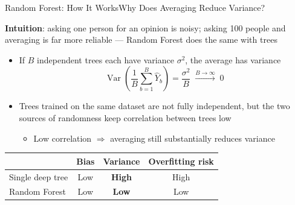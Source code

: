 \documentclass[hyperref={pdfpagelabels=false}]{beamer}
\begin{document}
\begin{frame}{Random Forest: How It Works}{Why Does Averaging Reduce Variance?}

\textbf{Intuition}: asking one person for an opinion is noisy; asking 100 people and averaging is far more reliable --- Random Forest does the same with trees

\vspace{0.3cm}
\begin{itemize}
  \item If $B$ independent trees each have variance $\sigma^2$, the average has variance
  \begin{equation*}
    \operatorname{Var}\!\left(\frac{1}{B}\sum_{b=1}^{B}\hat{Y}_{b}\right)
    = \frac{\sigma^2}{B} \;\xrightarrow{B\to\infty}\; 0
  \end{equation*}

  \item Trees trained on the same dataset are not fully independent, but the two sources of randomness keep correlation between trees low
  \vspace{0.1cm}
  \begin{itemize}
    \item Low correlation $\Rightarrow$ averaging still substantially reduces variance
  \end{itemize}
\end{itemize}

\vspace{0.3cm}
\begin{center}
\begin{tabular}{lccc}
  \toprule
                   & Bias & Variance       & Overfitting risk \\
  \midrule
  Single deep tree & Low  & \textbf{High}  & High \\
  Random Forest    & Low  & \textbf{Low}   & Low  \\
  \bottomrule
\end{tabular}
\end{center}
\end{frame}
\end{document}

